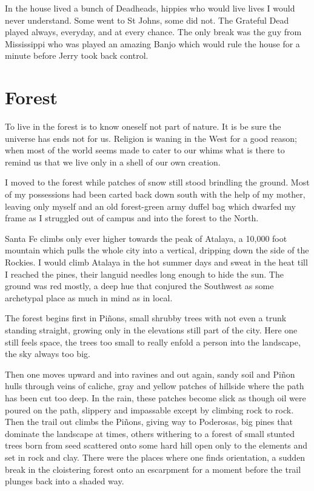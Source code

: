 \documentclass[ebook, 10pt, openright, onecolumn]{memoir}
\begin{document}
In the house lived a bunch of Deadheads, hippies who would live lives I would
never understand.  Some went to St Johns, some did not.  The Grateful Dead
played always, everyday, and at every chance.  The only break was the guy from
Mississippi who was played an amazing Banjo which would rule the house for a
minute before Jerry took back control.

\chapter{Forest}
\label{cha:forest}

To live in the forest is to know oneself not part of nature.  It is be sure the
universe has ends not for us.  Religion is waning in the West for a good
reason; when most of the world seems made to cater to our whims what is there to
remind us that we live only in a shell of our own creation.

I moved to the forest while patches of snow still stood brindling the
ground. Most of my possessions had been carted back down south with the help of
my mother, leaving only myself and an old forest-green army duffel bag which
dwarfed my frame as I struggled out of campus and into the forest to the North.

Santa Fe climbs only ever higher towards the peak of Atalaya, a 10,000 foot
mountain which pulls the whole city into a vertical, dripping down the side of
the Rockies. I would climb Atalaya in the hot summer days and sweat in the heat
till I reached the pines, their languid needles long enough to hide the sun.
The ground was red mostly, a deep hue that conjured the Southwest as some
archetypal place as much in mind as in local.

The forest begins first in Piñons, small shrubby trees with not even a trunk
standing straight, growing only in the elevations still part of the city.  Here
one still feels space, the trees too small to really enfold a person into the
landscape, the sky always too big. 

Then one moves upward and into ravines and out again, sandy soil and Piñon hulls
through veins of caliche, gray and yellow patches of hillside where the path has
been cut too deep. In the rain, these patches become slick as though oil were
poured on the path, slippery and impassable except by climbing rock to rock.
Then the trail out climbs the Piñons, giving way to Poderosas, big pines that
dominate the landscape at times, others withering to a forest of small stunted
trees born from seed scattered onto some hard hill open only to the elements
and set in rock and clay.  There were the places where one finds orientation, a
sudden break in the cloistering forest onto an escarpment for a moment before the
trail plunges back into a shaded way.
\end{document}
